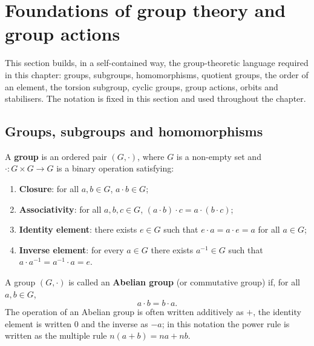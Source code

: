\section{Foundations of group theory and group actions}
\label{sec:group_theory}

This section builds, in a self-contained way, the group-theoretic language required in this chapter: groups, subgroups, homomorphisms, quotient groups, the order of an element, the torsion subgroup, cyclic groups, group actions, orbits and stabilisers. The notation is fixed in this section and used throughout the chapter.

\subsection{Groups, subgroups and homomorphisms}

\begin{definition}[Group]\label{def:group}
A \textbf{group} is an ordered pair $(G,\cdot)$, where $G$ is a non-empty set and $\cdot:G\times G\to G$ is a binary operation satisfying:
\begin{enumerate}[label=(\arabic*)]
    \item \textbf{Closure}: for all $a,b\in G$, $a\cdot b\in G$;
    \item \textbf{Associativity}: for all $a,b,c\in G$, $(a\cdot b)\cdot c=a\cdot(b\cdot c)$;
    \item \textbf{Identity element}: there exists $e\in G$ such that $e\cdot a=a\cdot e=a$ for all $a\in G$;
    \item \textbf{Inverse element}: for every $a\in G$ there exists $a^{-1}\in G$ such that $a\cdot a^{-1}=a^{-1}\cdot a=e$.
\end{enumerate}
\end{definition}

\begin{definition}\label{def:abelian_group}
A group $(G,\cdot)$ is called an \textbf{Abelian group} (or commutative group) if, for all $a,b\in G$,
\[
a\cdot b=b\cdot a.
\]
The operation of an Abelian group is often written additively as $+$, the identity element is written $0$ and the inverse as $-a$; in this notation the power rule is written as the multiple rule $n(a+b)=na+nb$.
\end{definition}

